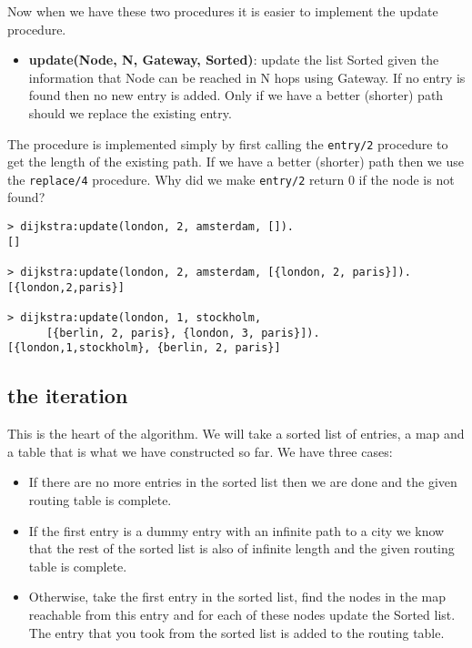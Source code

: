 \documentclass[a4paper, 11pt]{article}
\begin{document}
\noindent Now when we have these two procedures it is easier to
implement the update procedure.

\begin{itemize}
\item {\bf update(Node, N, Gateway, Sorted)}: update the list Sorted
given the information that Node can be reached in N hops using
Gateway. If no entry is found then no new entry is added. Only if we
have a better (shorter) path should we replace the existing entry.
\end{itemize}

\noindent The procedure is implemented simply by first calling the
{\tt entry/2} procedure to get the length of the existing path. If we
have a better (shorter) path then we use the {\tt replace/4}
procedure. Why did we make {\tt entry/2} return 0 if the node is not
found?

\begin{verbatim}
> dijkstra:update(london, 2, amsterdam, []).
[]

> dijkstra:update(london, 2, amsterdam, [{london, 2, paris}]).
[{london,2,paris}]

> dijkstra:update(london, 1, stockholm, 
      [{berlin, 2, paris}, {london, 3, paris}]).
[{london,1,stockholm}, {berlin, 2, paris}]
\end{verbatim}

\subsection{the iteration}

This is the heart of the algorithm. We will take a sorted list of
entries, a map and a table that is what we have constructed so far. We have three cases:

\begin{itemize}
\item If there are no more entries in the sorted list then we are done and the
given routing table is complete.  

\item If the first entry is a dummy entry with an infinite path to a
  city we know that the rest of the sorted list is also of infinite length and 
 the given routing table is complete.  

\item Otherwise, take the first entry in
the sorted list, find the nodes in the map reachable from this entry
and for each of these nodes update the Sorted list. The entry that
you took from the sorted list is added to the routing table. 
\end{itemize}
\end{document}
